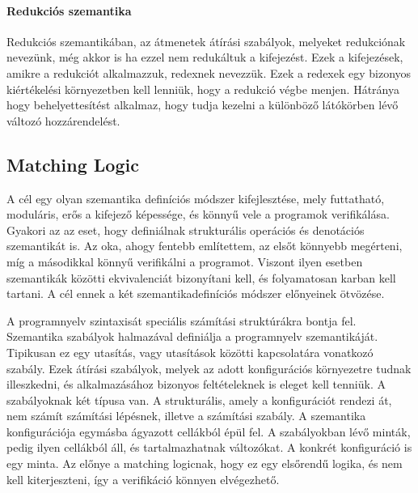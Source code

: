 \documentclass[]{article}
\begin{document}
\paragraph*{Redukciós szemantika}
Redukciós szemantikában, az átmenetek átírási szabályok, melyeket redukciónak nevezünk, még akkor is ha ezzel nem redukáltuk a kifejezést. Ezek a kifejezések, amikre a redukciót alkalmazzuk, redexnek nevezzük. Ezek a redexek egy bizonyos kiértékelési környezetben kell lenniük, hogy a redukció végbe menjen. Hátránya hogy behelyettesítést alkalmaz, hogy tudja kezelni a különböző látókörben lévő változó hozzárendelést.

\subsection*{Matching Logic}
A cél egy olyan szemantika definíciós módszer kifejlesztése, mely futtatható, moduláris, erős a kifejező képessége, és könnyű vele a programok verifikálása. Gyakori az az eset, hogy definiálnak strukturális operációs és denotációs szemantikát is. Az oka, ahogy fentebb említettem, az elsőt könnyebb megérteni, míg a másodikkal könnyű verifikálni a programot. Viszont ilyen esetben szemantikák közötti ekvivalenciát bizonyítani kell, és folyamatosan karban kell tartani. A cél ennek a két szemantikadefiníciós módszer előnyeinek ötvözése.

A programnyelv szintaxisát speciális számítási struktúrákra bontja fel. Szemantika szabályok halmazával definiálja a programnyelv szemantikáját. Tipikusan ez egy utasítás, vagy utasítások közötti kapcsolatára vonatkozó szabály. Ezek átírási szabályok, melyek az adott konfigurációs környezetre tudnak illeszkedni, és alkalmazásához bizonyos feltételeknek is eleget kell tenniük. A szabályoknak két típusa van. A strukturális, amely a konfigurációt rendezi át, nem számít számítási lépésnek, illetve a számítási szabály. A szemantika konfigurációja egymásba ágyazott cellákból épül fel. A szabályokban lévő minták, pedig ilyen cellákból áll, és tartalmazhatnak változókat. A konkrét konfiguráció is egy minta. Az előnye a matching logicnak, hogy ez egy elsőrendű logika, és nem kell kiterjeszteni, így a verifikáció könnyen elvégezhető.


\printbibliography[title = {Referencia}]
\end{document}
